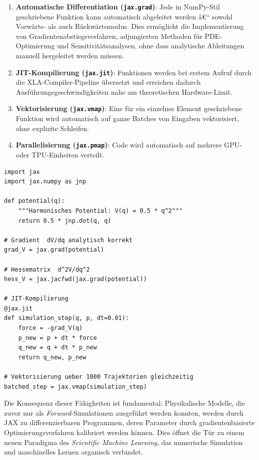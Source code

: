 \documentclass[12pt, a4paper]{article}
\begin{document}
\begin{enumerate}
  \item \textbf{Automatische Differentiation (\texttt{jax.grad})}: Jede
    in NumPy-Stil geschriebene Funktion kann automatisch abgeleitet
    werden â€“ sowohl Vorwärts- als auch Rückwärtsmodus. Dies ermöglicht
    die Implementierung von Gradientenabstiegsverfahren, adjungierten
    Methoden für PDE-Optimierung und Sensitivitätsanalysen, ohne dass
    analytische Ableitungen manuell hergeleitet werden müssen.

  \item \textbf{JIT-Kompilierung (\texttt{jax.jit})}: Funktionen werden
    bei erstem Aufruf durch die XLA-Compiler-Pipeline übersetzt und
    erreichen dadurch Ausführungsgeschwindigkeiten nahe am theoretischen
    Hardware-Limit.

  \item \textbf{Vektorisierung (\texttt{jax.vmap})}: Eine für ein einzelnes
    Element geschriebene Funktion wird automatisch auf ganze Batches von
    Eingaben vektorisiert, ohne explizite Schleifen.

  \item \textbf{Parallelisierung (\texttt{jax.pmap})}: Code wird
    automatisch auf mehrere GPU- oder TPU-Einheiten verteilt.
\end{enumerate}

\begin{lstlisting}[caption={JAX: Automatische Differentiation und JIT}]
import jax
import jax.numpy as jnp

def potential(q):
    """Harmonisches Potential: V(q) = 0.5 * q^2"""
    return 0.5 * jnp.dot(q, q)

# Gradient  dV/dq analytisch korrekt
grad_V = jax.grad(potential)

# Hessematrix  d^2V/dq^2
hess_V = jax.jacfwd(jax.grad(potential))

# JIT-Kompilierung
@jax.jit
def simulation_step(q, p, dt=0.01):
    force = -grad_V(q)
    p_new = p + dt * force
    q_new = q + dt * p_new
    return q_new, p_new

# Vektorisierung ueber 1000 Trajektorien gleichzeitig
batched_step = jax.vmap(simulation_step)
\end{lstlisting}

Die Konsequenz dieser Fähigkeiten ist fundamental: Physikalische Modelle,
die zuvor nur als \emph{Forward}-Simulationen ausgeführt werden konnten,
werden durch JAX zu differenzierbaren Programmen, deren Parameter durch
gradientenbasierte Optimierungsverfahren kalibriert werden können. Dies
öffnet die Tür zu einem neuen Paradigma des \emph{Scientific Machine
Learning}, das numerische Simulation und maschinelles Lernen organisch
verbindet.
\end{document}
